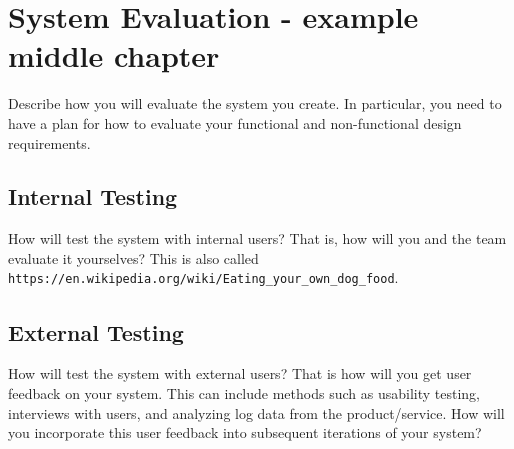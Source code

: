 \chapter{System Evaluation - example middle chapter}

Describe how you will evaluate the system you create. In particular, you need to have a plan for how to evaluate your functional and non-functional design requirements.

\section{Internal Testing}
How will test the system with internal users? That is, how will you and the team evaluate it yourselves? This is also called \verb$https://en.wikipedia.org/wiki/Eating_your_own_dog_food$.

\section{External Testing}
How will test the system with external users? That is how will you get user feedback on your system. This can include methods such as usability testing, interviews with users, and analyzing log data from the product/service. How will you incorporate this user feedback into subsequent iterations of your system?

